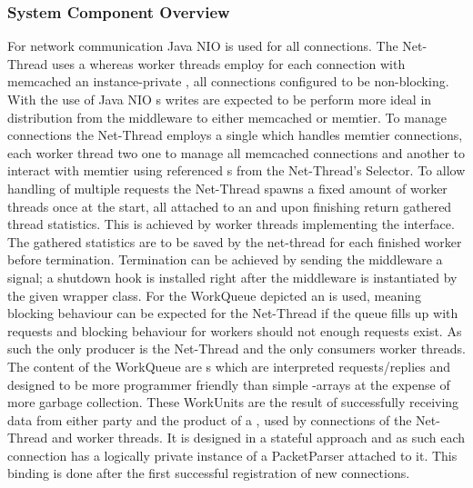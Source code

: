     \subsubsection{System Component Overview}
        For network communication Java NIO is used for all connections. The Net-Thread uses a 
        whereas worker threads employ for each connection with memcached an instance-private , all
        connections configured to be non-blocking. With the use of Java NIO s writes are expected to be
        perform more ideal in distribution from the middleware to either memcached or memtier. To manage connections the
        Net-Thread employs a single  which handles memtier connections, each worker thread two\textemdash
        one to manage all memcached connections and another to interact with memtier using referenced s
        from the Net-Thread's Selector. To allow handling of multiple requests the Net-Thread spawns a fixed amount of
        worker threads once at the start, all attached to an  and upon finishing return gathered
        thread statistics. This is achieved by worker threads implementing the  interface. The gathered
        statistics are to be saved by the net-thread for each finished worker before termination. Termination can be
        achieved by sending the middleware a  signal; a shutdown hook is installed right after the
        middleware is instantiated by the given wrapper class.\newline
        For the WorkQueue depicted an  is used, meaning blocking behaviour can be expected for
        the Net-Thread if the queue fills up with requests and blocking behaviour for workers should not enough requests
        exist. As such the only producer is the Net-Thread and the only consumers worker threads. The content of the
        WorkQueue are s which are interpreted requests/replies and designed to be more programmer friendly
        than simple -arrays at the expense of more garbage collection. These WorkUnits are the result of
        successfully receiving data from either party and the product of a , used by connections of the
        Net-Thread and worker threads. It is designed in a stateful approach and as such each connection has a logically
        private instance of a PacketParser attached to it. This binding is done after the first successful registration
        of new connections.

